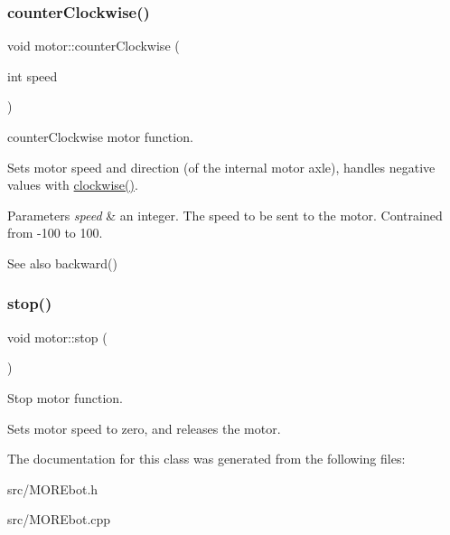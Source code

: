 \subsubsection{\texorpdfstring{counterClockwise()}{counterClockwise()}}
{\footnotesize\ttfamily void motor\+::counter\+Clockwise (\begin{DoxyParamCaption}\item[{int}]{speed }\end{DoxyParamCaption})}



counter\+Clockwise motor function. 

Sets motor speed and direction (of the internal motor axle), handles negative values with \mbox{\hyperlink{classmotor_aa430473ab7a4844313c74f25e8ad680b}{clockwise()}}. 
\begin{DoxyParams}{Parameters}
{\em speed} & an integer. The speed to be sent to the motor. Contrained from -\/100 to 100. \\
\hline
\end{DoxyParams}
\begin{DoxySeeAlso}{See also}
backward() 
\end{DoxySeeAlso}
\mbox{\label{classmotor_a9395e462f009a775c5fbe11f4c39150c}} 
\subsubsection{\texorpdfstring{stop()}{stop()}}
{\footnotesize\ttfamily void motor\+::stop (\begin{DoxyParamCaption}{ }\end{DoxyParamCaption})}



Stop motor function. 

Sets motor speed to zero, and releases the motor. 

The documentation for this class was generated from the following files\+:\begin{DoxyCompactItemize}
\item 
src/M\+O\+R\+Ebot.\+h\item 
src/M\+O\+R\+Ebot.\+cpp\end{DoxyCompactItemize}
